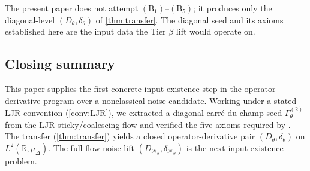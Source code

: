 \documentclass[11pt,reqno]{amsart}
\theoremstyle{plain}
\theoremstyle{definition}
\theoremstyle{remark}
\newcommand{\R}{\mathbb{R}}
\newcommand{\cN}{\mathcal N}
\newcommand{\Dth}{D_{\theta}}
\newcommand{\divth}{\delta_{\theta}}
\begin{document}
The present paper does not attempt $(\mathrm B_{1})$--$(\mathrm B_{5})$;
it produces only the diagonal-level $(\Dth,\divth)$ of
\cref{thm:transfer}. The diagonal seed and its axioms
established here are the input data the Tier $\beta$ lift would
operate on.

\subsection{Closing summary}\label{sec:beta-summary}

This paper supplies the first concrete input-existence step in
the operator-derivative program over a nonclassical-noise
candidate. Working under a stated LJR convention
(\cref{conv:LJR}), we extracted a diagonal carr\'e-du-champ seed
$\Gamma^{(2)}_{\theta}$ from the LJR sticky/coalescing flow and
verified the five axioms required by
\cite{GammaHierarchyDivergence}. The transfer
(\cref{thm:transfer}) yields a closed operator-derivative pair
$(\Dth,\divth)$ on $L^{2}(\R,\mu_{\Delta})$. The full
flow-noise lift $(D_{\cN_{\theta}},\delta_{\cN_{\theta}})$ is the
next input-existence problem.
\end{document}
